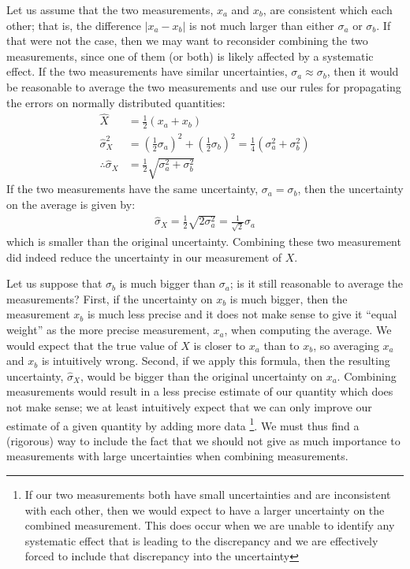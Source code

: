 Let us assume that the two measurements, $x_a$ and $x_b$, are consistent which each other; that is, the difference $|x_a-x_b|$ is not much larger than either $\sigma_a$ or $\sigma_b$. If that were not the case, then we may want to reconsider combining the two measurements, since one of them (or both) is likely affected by a systematic effect. If the two measurements have similar uncertainties, $\sigma_a\approx\sigma_b$, then it would be reasonable to average the two measurements and use our rules for propagating the errors on normally distributed quantities:
\begin{align}
\hat X&= \frac{1}{2}(x_a+x_b)\nonumber\\
\hat \sigma_X^2 &=\left(\frac{1}{2}\sigma_a\right)^2+\left(\frac{1}{2}\sigma_b\right)^2=\frac{1}{4}(\sigma_a^2+\sigma_b^2)\nonumber\\
\therefore \hat \sigma_X &= \frac{1}{2}\sqrt{\sigma_a^2+\sigma_b^2}
\end{align}
If the two measurements have the same uncertainty, $\sigma_a=\sigma_b$, then the uncertainty on the average is given by:
\begin{align}
\hat \sigma_X=\frac{1}{2}\sqrt{2 \sigma_a^2}=\frac{1}{\sqrt{2}}\sigma_a
\end{align} 
which is smaller than the original uncertainty. Combining these two measurement did indeed reduce the uncertainty in our measurement of $X$. 

Let us suppose that $\sigma_b$ is much bigger than $\sigma_a$; is it still reasonable to average the measurements? First, if the uncertainty on $x_b$ is much bigger, then the measurement  $x_b$ is much less precise and it does not make sense to give it ``equal weight'' as the more precise measurement, $x_a$, when computing the average. We would expect that the true value of $X$ is closer to $x_a$ than to $x_b$, so averaging $x_a$ and $x_b$ is intuitively wrong. Second, if we apply this formula, then the resulting uncertainty, $\hat \sigma_X$, would be bigger than the original uncertainty on $x_a$. Combining measurements would result in a less precise estimate of our quantity which does not make sense; we at least intuitively expect that we can only improve our estimate of a given quantity by adding more data \footnote{If our two measurements both have small uncertainties and are inconsistent with each other, then we would expect to have a larger uncertainty on the combined measurement. This does occur when we are unable to identify any systematic effect that is leading to the discrepancy and we are effectively forced to include that discrepancy into the uncertainty}. We must thus find a (rigorous) way to include the fact that we should not give as much importance to measurements with large uncertainties when combining measurements.

